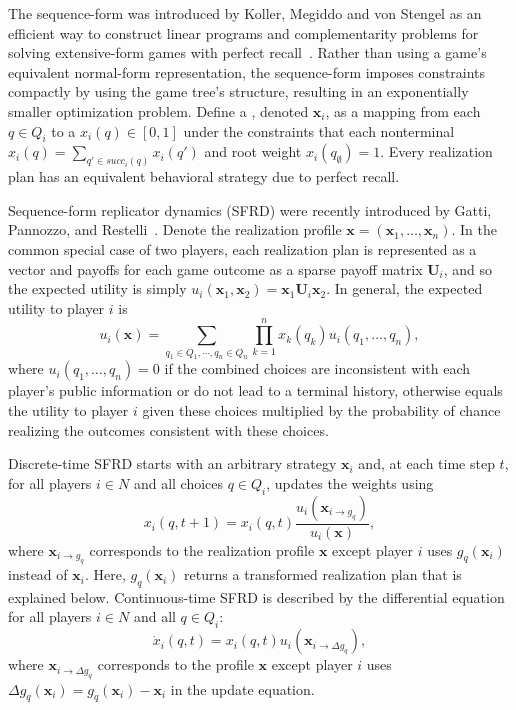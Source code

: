 \documentclass{aamas2014}
\newcommand{\bx}{\mathbf{x}}
\newcommand{\bU}{\mathbf{U}}
\newcommand{\defword}[1]{\textbf{\boldmath{#1}}}
\begin{document}
The sequence-form was introduced by Koller, Megiddo and von Stengel as an efficient way to construct
linear programs and complementarity problems for solving extensive-form games with perfect recall~\cite{SequenceFormLPs}. Rather than using a
game's equivalent normal-form representation, the sequence-form imposes constraints compactly by using the game tree's structure, 
resulting in an exponentially smaller optimization problem.
Define a \defword{realization plan}, denoted $\bx_i$, as a mapping from each $q \in Q_i$ to a \defword{realization weight} 
$x_i(q) \in [0,1]$ under the constraints that each nonterminal $x_i(q) = \sum_{q' \in succ_i(q)} x_i(q')$ and root weight $x_i(q_{\emptyset}) = 1$. 
Every realization plan has an equivalent behavioral strategy due to perfect recall. 

Sequence-form replicator dynamics (SFRD) were recently introduced by Gatti, Pannozzo, and Restelli~\cite{Gatti13Efficient}. 
Denote the realization profile $\bx = (\bx_1, \ldots, \bx_n)$. 
In the common special case of two players, each realization plan is represented as a vector and payoffs for each game outcome
as a sparse payoff matrix $\bU_i$, 
and so the expected utility is simply $u_i(\bx_1, \bx_2) = \bx_1 \bU_i \bx_2$. 
In general, the expected utility to player $i$ is  
\begin{equation}
\label{eq:util}
u_i(\bx) = \sum_{q_1 \in Q_1, \cdots, q_n \in Q_n} \prod_{k=1}^n x_k(q_k) u_i(q_1, \ldots, q_n),
\end{equation}
where $u_i(q_1, \ldots, q_n) = 0$ if the combined choices are inconsistent with each player's public information 
or do not lead to a terminal history, otherwise  
equals the utility to player $i$ given these choices multiplied by the probability of chance realizing the outcomes 
consistent with these choices. 

Discrete-time SFRD starts with an arbitrary strategy $\bx_i$ and, at each time step $t$, for all players $i \in N$ and all 
choices $q \in Q_i$, updates the weights using
\begin{equation}
\label{eq:dt-sfrd}
x_i(q,t+1) = x_i(q,t) \frac{u_i(\bx_{i \rightarrow g_{q}})}{u_i(\bx)},
\end{equation}
where $\bx_{i \rightarrow g_q}$ corresponds to the realization profile $\bx$ except player $i$ uses $g_q(\bx_i)$ instead of $\bx_i$. 
Here, $g_q(\bx_i)$ returns a transformed realization plan that is explained below. 
Continuous-time SFRD is described by the differential equation for all players $i \in N$ and all $q \in Q_i$:
\begin{equation}
\label{eq:ct-sfrd}
\dot{x}_i(q,t) = x_i(q,t) u_i(\bx_{i \rightarrow \Delta g_{q}}),
\end{equation}
where $\bx_{i \rightarrow \Delta g_q}$ corresponds to the profile $\bx$ except player $i$ uses $\Delta g_q(\bx_i) = g_q(\bx_i) - \bx_i$
in the update equation. 
\end{document}
